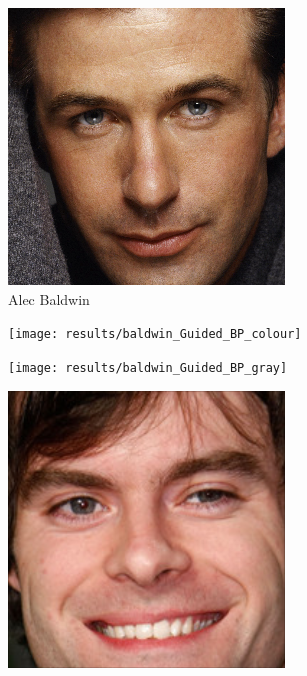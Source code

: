 \documentclass{article}
\begin{document}
\begin{figure}
	\ContinuedFloat
	\begin{subfigure}[t]{0.33\linewidth}
		\includegraphics[width=\linewidth]{most_baldwin}
		\caption{Alec Baldwin}
	\end{subfigure}
	\begin{subfigure}[t]{0.33\linewidth}
		\texttt{[image: results/baldwin\_Guided\_BP\_colour]}
	\end{subfigure}
	\begin{subfigure}[t]{0.33\linewidth}
		\texttt{[image: results/baldwin\_Guided\_BP\_gray]}
	\end{subfigure}\vspace{1em}
	\begin{subfigure}[t]{0.33\linewidth}
		\includegraphics[width=\linewidth]{most_hader}

\end{subfigure}
\end{figure}
\end{document}
